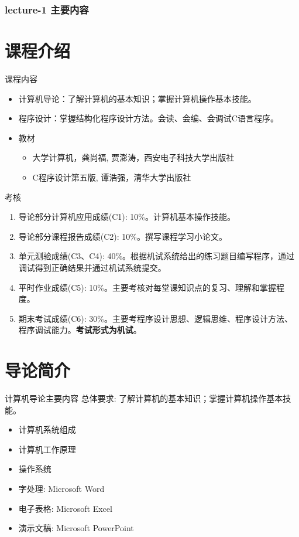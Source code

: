 \begin{frame}
  \frametitle{lecture-1 主要内容}
  \tableofcontents[hideallsubsections]
\end{frame}

\section{课程介绍}

\begin{frame}{课程内容}
\begin{itemize}
	\item 计算机导论：了解计算机的基本知识；掌握计算机操作基本技能。
	\item 程序设计：掌握结构化程序设计方法。会读、会编、会调试C语言程序。
	\item 教材
	\begin{itemize}
		\item 大学计算机，龚尚福, 贾澎涛，西安电子科技大学出版社
		\item C程序设计第五版, 谭浩强，清华大学出版社
	\end{itemize}
\end{itemize}
\end{frame}

\begin{frame}{考核}
\begin{enumerate}
	\item 导论部分计算机应用成绩(C1): 10\%。计算机基本操作技能。
	\item 导论部分课程报告成绩(C2): 10\%。撰写课程学习小论文。
	\item 单元测验成绩(C3、C4): 40\%。根据机试系统给出的练习题目编写程序，通过调试得到正确结果并通过机试系统提交。
	\item 平时作业成绩(C5): 10\%。主要考核对每堂课知识点的复习、理解和掌握程度。
	\item 期末考试成绩(C6): 30\%。主要考程序设计思想、逻辑思维、程序设计方法、程序调试能力。\textbf{考试形式为机试}。
\end{enumerate}
\end{frame}

\section{导论简介}

\begin{frame}{计算机导论主要内容}
总体要求: 了解计算机的基本知识；掌握计算机操作基本技能。\\
\begin{itemize}
	\item 计算机系统组成
	\item 计算机工作原理
	\item 操作系统
	\item 字处理: Microsoft Word
	\item 电子表格: Microsoft Excel
	\item 演示文稿: Microsoft PowerPoint
\end{itemize}
\end{frame}

